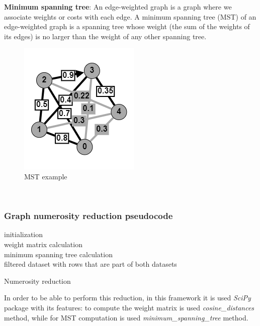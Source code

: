 \documentclass[\main/main.tex]{subfiles}
\begin{document}
\textbf{Minimum spanning tree}: An edge-weighted graph is a graph where we associate weights or costs with each edge. A minimum spanning tree (MST) of an edge-weighted graph is a spanning tree whose weight (the sum of the weights of its edges) is no larger than the weight of any other spanning tree.
\begin{center}
    \begin{figure}[h]
    \centering
    \includegraphics[scale=1.25]{images/methods/mst_example.png}
    \caption{MST example}
    \label{fig:mst_example}
\end{figure}
\end{center}
\cite{books/daglib/0029345}\\
\subsubsection{Graph numerosity reduction pseudocode}
\begin{center}
    \begin{algorithm}[H]
     initialization\\
     weight matrix calculation\\
     minimum spanning tree calculation\\
     \Return filtered dataset with rows that are part of both datasets
     \caption{Numerosity reduction}
    \end{algorithm}
\end{center}
In order to be able to perform this reduction, in this framework it is used \emph{SciPy} \cite{2020SciPyNMeth} package with its features: to compute the weight matrix is used \emph{cosine\_distances} method, while for MST computation is used \emph{minimum\_spanning\_tree} method.
\end{document}
